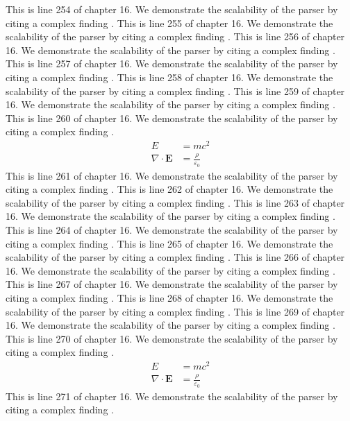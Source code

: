 This is line 254 of chapter 16. We demonstrate the scalability of the parser by citing a complex finding \cite{ref16_254}.
This is line 255 of chapter 16. We demonstrate the scalability of the parser by citing a complex finding \cite{ref16_255}.
This is line 256 of chapter 16. We demonstrate the scalability of the parser by citing a complex finding \cite{ref16_256}.
This is line 257 of chapter 16. We demonstrate the scalability of the parser by citing a complex finding \cite{ref16_257}.
This is line 258 of chapter 16. We demonstrate the scalability of the parser by citing a complex finding \cite{ref16_258}.
This is line 259 of chapter 16. We demonstrate the scalability of the parser by citing a complex finding \cite{ref16_259}.
This is line 260 of chapter 16. We demonstrate the scalability of the parser by citing a complex finding \cite{ref16_260}.
\begin{align*}
  E &= mc^2 \\
  \nabla \cdot \mathbf{E} &= \frac{\rho}{\varepsilon_0}
\end{align*}
This is line 261 of chapter 16. We demonstrate the scalability of the parser by citing a complex finding \cite{ref16_261}.
This is line 262 of chapter 16. We demonstrate the scalability of the parser by citing a complex finding \cite{ref16_262}.
This is line 263 of chapter 16. We demonstrate the scalability of the parser by citing a complex finding \cite{ref16_263}.
This is line 264 of chapter 16. We demonstrate the scalability of the parser by citing a complex finding \cite{ref16_264}.
This is line 265 of chapter 16. We demonstrate the scalability of the parser by citing a complex finding \cite{ref16_265}.
This is line 266 of chapter 16. We demonstrate the scalability of the parser by citing a complex finding \cite{ref16_266}.
This is line 267 of chapter 16. We demonstrate the scalability of the parser by citing a complex finding \cite{ref16_267}.
This is line 268 of chapter 16. We demonstrate the scalability of the parser by citing a complex finding \cite{ref16_268}.
This is line 269 of chapter 16. We demonstrate the scalability of the parser by citing a complex finding \cite{ref16_269}.
This is line 270 of chapter 16. We demonstrate the scalability of the parser by citing a complex finding \cite{ref16_270}.
\begin{align*}
  E &= mc^2 \\
  \nabla \cdot \mathbf{E} &= \frac{\rho}{\varepsilon_0}
\end{align*}
This is line 271 of chapter 16. We demonstrate the scalability of the parser by citing a complex finding \cite{ref16_271}.

